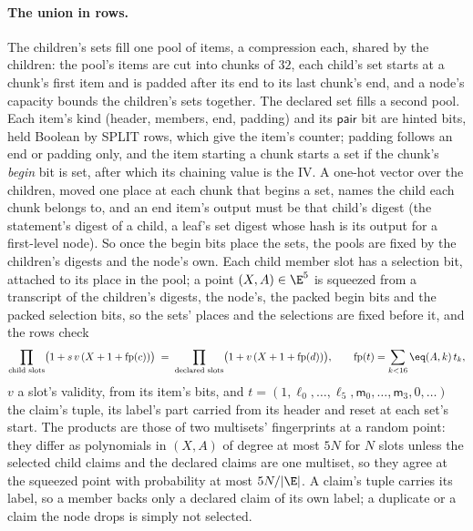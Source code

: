 \paragraph{The union in rows.} The children's sets fill one pool of items, a compression each, shared by the children: the pool's items are cut into chunks of $32$, each child's set starts at a chunk's first item and is padded after its end to its last chunk's end, and a node's capacity bounds the children's sets together. The declared set fills a second pool. Each item's kind (header, members, end, padding) and its $\mathsf{pair}$ bit are hinted bits, held Boolean by \textsf{SPLIT} rows, which give the item's counter; padding follows an end or padding only, and the item starting a chunk starts a set if the chunk's \emph{begin} bit is set, after which its chaining value is the IV. A one-hot vector over the children, moved one place at each chunk that begins a set, names the child each chunk belongs to, and an end item's output must be that child's digest (the statement's digest of a child, a leaf's set digest whose hash is its output for a first-level node). So once the begin bits place the sets, the pools are fixed by the children's digests and the node's own. Each child member slot has a selection bit, attached to its place in the pool; a point $(X,A)\in\E^5$ is squeezed from a transcript of the children's digests, the node's, the packed begin bits and the packed selection bits, so the sets' places and the selections are fixed before it, and the rows check
\[
  \prod_{\text{child slots}}\bigl(1+s\,v\,(X+1+\mathrm{fp}(c))\bigr)\;=\;\prod_{\text{declared slots}}\bigl(1+v\,(X+1+\mathrm{fp}(d))\bigr),\qquad \mathrm{fp}(t)=\sum_{k<16}\eq(A,k)\,t_k,
\]
$v$ a slot's validity, from its item's bits, and $t=(1,\ell_0,\dots,\ell_5,\mathsf{m}_0,\dots,\mathsf{m}_3,0,\dots)$ the claim's tuple, its label's part carried from its header and reset at each set's start. The products are those of two multisets' fingerprints at a random point: they differ as polynomials in $(X,A)$ of degree at most $5N$ for $N$ slots unless the selected child claims and the declared claims are one multiset, so they agree at the squeezed point with probability at most $5N/|\E|$. A claim's tuple carries its label, so a member backs only a declared claim of its own label; a duplicate or a claim the node drops is simply not selected.

